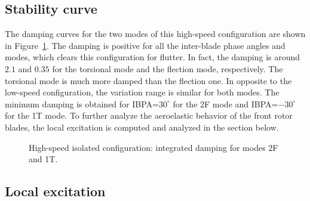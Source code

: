 
\subsection{Stability curve}
\label{sub:dream_hs_ael_curve}

The damping curves for the two modes of this high-speed
configuration are shown in Figure~\ref{fig:dream_hs_ael_damping}.
The damping is positive for all the inter-blade phase angles
and modes, which clears this configuration for flutter.
In fact, the damping is around $2.1$ and $0.35$
for the torsional mode and the flection mode, respectively.
The torsional mode is much more damped than the flection one.
In opposite to the low-speed configuration, the 
variation range is similar for both modes. 
The minimum damping is obtained for IBPA=$30^\circ$
for the 2F mode and IBPA=$-30^\circ$ for the 1T mode.
To further analyze the aeroelastic behavior of the front rotor 
blades, the local excitation is computed and analyzed in
the section below.
\begin{figure}[htp]
  \centering
  \caption{High-speed isolated configuration: integrated damping for modes 2F and 1T.}
  \label{fig:dream_hs_ael_damping}
\end{figure}

\subsection{Local excitation}
\label{sub:dream_hs_ael_local_damping}

